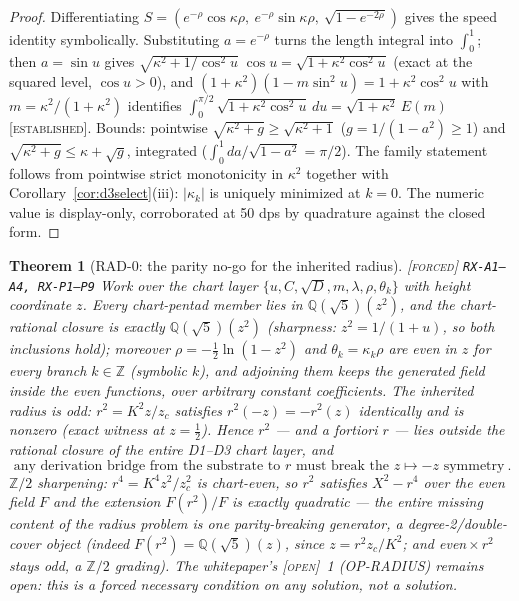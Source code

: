 \documentclass[11pt]{article}
\newcommand{\tagF}{\textcolor{cF}{\textsc{[forced]}}}
\newcommand{\tagE}{\textcolor{cE}{\textsc{[established]}}}
\newcommand{\tagO}{\textcolor{cO}{\textsc{[open]}}}
\newcommand{\hx}[1]{\textcolor{cC}{\footnotesize\texttt{#1}}}
\newcommand{\Q}{\mathbb{Q}}
\newcommand{\Z}{\mathbb{Z}}
\theoremstyle{plain}
\newtheorem{theorem}{Theorem}[section]
\theoremstyle{definition}
\theoremstyle{remark}
\begin{document}
\begin{proof}
Differentiating $S=(e^{-\rho}\cos\kappa\rho,\ e^{-\rho}\sin\kappa\rho,\
\sqrt{1-e^{-2\rho}})$ gives the speed identity symbolically. Substituting
$a=e^{-\rho}$ turns the length integral into $\int_0^1$; then $a=\sin u$
gives $\sqrt{\kappa^2+1/\cos^2u}\;\cos u=\sqrt{1+\kappa^2\cos^2u}$
(exact at the squared level, $\cos u>0$), and
$(1+\kappa^2)(1-m\sin^2u)=1+\kappa^2\cos^2u$ with
$m=\kappa^2/(1+\kappa^2)$ identifies
$\int_0^{\pi/2}\sqrt{1+\kappa^2\cos^2u}\,du=\sqrt{1+\kappa^2}\,E(m)$
\tagE{}. Bounds: pointwise $\sqrt{\kappa^2+g}\ge\sqrt{\kappa^2+1}$
($g=1/(1-a^2)\ge1$) and $\sqrt{\kappa^2+g}\le\kappa+\sqrt g$, integrated
($\int_0^1 da/\sqrt{1-a^2}=\pi/2$). The family statement follows from
pointwise strict monotonicity in $\kappa^2$ together with
Corollary~\ref{cor:d3select}(iii): $|\kappa_k|$ is uniquely minimized at
$k=0$. The numeric value is display-only, corroborated at 50 dps by
quadrature against the closed form.
\end{proof}

\begin{theorem}[RAD-0: the parity no-go for the inherited radius]\label{thm:paritynogo}\tagF{} \hx{RX-A1--A4, RX-P1--P9}
Work over the chart layer $\{u,C,\sqrt D,m,\lambda,\rho,\theta_k\}$ with
height coordinate $z$. Every chart-pentad member lies in
$\Q(\sqrt5)(z^2)$, and the chart-rational closure is \emph{exactly}
$\Q(\sqrt5)(z^2)$ (sharpness: $z^2=1/(1+u)$, so both inclusions hold);
moreover $\rho=-\tfrac12\ln(1-z^2)$ and $\theta_k=\kappa_k\rho$ are even in
$z$ for \emph{every} branch $k\in\Z$ (symbolic $k$), and adjoining them
keeps the generated field inside the even functions, over arbitrary
constant coefficients. The inherited radius is odd: $r^2=K^2z/z_c$
satisfies $r^2(-z)=-r^2(z)$ identically and is nonzero (exact witness at
$z=\tfrac12$). Hence $r^2$ --- and a fortiori $r$ --- lies \emph{outside}
the rational closure of the entire D1--D3 chart layer, and
\[
\boxed{\ \text{any derivation bridge from the substrate to } r \text{ must
break the } z\mapsto-z \text{ symmetry}\ }.
\]
$\Z/2$ sharpening: $r^4=K^4z^2/z_c^2$ \emph{is} chart-even, so $r^2$
satisfies $X^2-r^4$ over the even field $F$ and the extension $F(r^2)/F$
is exactly quadratic --- the entire missing content of the radius problem
is one parity-breaking generator, a degree-2/double-cover object (indeed
$F(r^2)=\Q(\sqrt5)(z)$, since $z=r^2z_c/K^2$; and even${}\times r^2$ stays
odd, a $\Z/2$ grading). The whitepaper's \tagO{}~1 (OP-RADIUS) remains
open: this is a forced \emph{necessary condition} on any solution, not a
solution.
\end{theorem}
\end{document}

